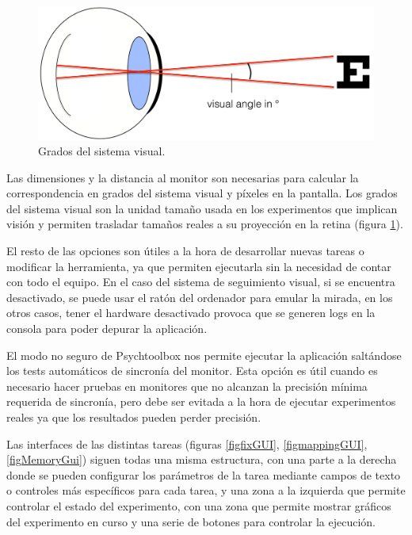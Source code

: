 \documentclass[conference]{IEEEtran}
\begin{document}
\begin{figure}[tp]
\centerline{\includegraphics[width=\linewidth]{figures/visual_degrees}}
\caption{Grados del sistema visual.}
\label{figvisualDegrees}
\end{figure}

Las dimensiones y la distancia al monitor son necesarias para calcular la correspondencia en grados del sistema visual y píxeles en la pantalla. Los grados del sistema visual son la unidad tamaño usada en los experimentos que implican visión y permiten trasladar tamaños reales a su proyección en la retina (figura \ref{figvisualDegrees}).

El resto de las opciones son útiles a la hora de desarrollar nuevas tareas o modificar la herramienta, ya que permiten ejecutarla sin la necesidad de contar con todo el equipo. En el caso del sistema de seguimiento visual, si se encuentra desactivado, se puede usar el ratón del ordenador para emular la mirada, en los otros casos, tener el hardware desactivado provoca que se generen logs en la consola para poder depurar la aplicación.

El modo no seguro de Psychtoolbox nos permite ejecutar la aplicación saltándose los tests automáticos de sincronía del monitor. Esta opción es útil cuando es necesario hacer pruebas en monitores que no alcanzan la precisión mínima requerida de sincronía, pero debe ser evitada a la hora de ejecutar experimentos reales ya que los resultados pueden perder precisión.

Las interfaces de las distintas tareas (figuras \ref{figfixGUI}, \ref{figmappingGUI}, \ref{figMemoryGui}) siguen todas una misma estructura, con una parte a la derecha donde se pueden configurar los parámetros de la tarea mediante campos de texto o controles más específicos para cada tarea, y una zona a la izquierda que permite controlar el estado del experimento, con una zona que permite mostrar gráficos del experimento en curso y una serie de botones para controlar la ejecución.
\end{document}
